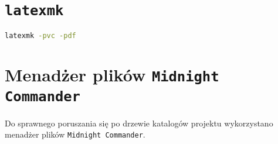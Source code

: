 \documentclass[praca_magisterska]{subfiles}
\begin{document}
\section{\texttt{latexmk}}

\begin{lstlisting}[language=bash,numbers=none,caption={Uruchomienie ciągłej kompilacji \LaTeX do PDF}]
latexmk -pvc -pdf
\end{lstlisting}

\section{Menadżer plików \texttt{Midnight Commander}}

Do sprawnego poruszania się po drzewie katalogów projektu wykorzystano menadżer plików \texttt{Midnight~Commander}.
\end{document}
